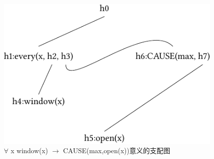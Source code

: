 \begin{figure}
\centering

\includegraphics{Figures/solution-mrs-all-cause-open-cropped.pdf}
\caption{$\forall$ x window(x) $\to$ CAUSE(max,open(x))意义的支配图\label{fig-alle-cause}}
\end{figure}%
